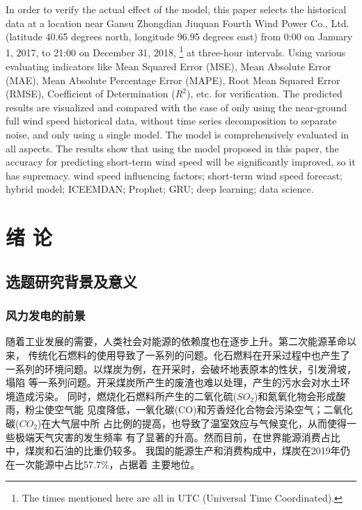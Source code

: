 \documentclass[AutoFakeBold]{LZUThesis}
\begin{document}
{{In order to verify the actual effect of the model, this paper selects the
historical data at a location near Gansu Zhongdian Jiuquan Fourth Wind Power
Co., Ltd. (latitude 40.65 degrees north, longitude 96.95 degrees east) from
0:00 on January 1, 2017, to 21:00 on December 31, 2018, 
\footnote{The times mentioned here are all in UTC (Universal Time Coordinated). }
at three-hour intervals. Using various evaluating indicators like Mean Squared
Error (MSE), Mean Absolute Error (MAE), Mean Absolute Percentage Error (MAPE),
Root Mean Squared Error (RMSE), Coefficient of Determination ($R^2$), etc.
for verification. The predicted results are visualized and compared with the
case of only using the near-ground full wind speed historical data, without
time series decomposition to separate noise, and only using a single model.
The model is comprehensively evaluated in all aspects. The results show
that using the model proposed in this paper, the accuracy for predicting
short-term wind speed will be significantly improved, so it has supremacy.
}}
{wind speed influencing factors; short-term wind speed forecast; 
hybrid model; ICEEMDAN; Prophet; GRU; deep learning; data science.
}

\tableofcontents


\mainmatter

\chapter{绪 \qquad 论}


\section{选题研究背景及意义}
\subsection{风力发电的前景}
随着工业发展的需要，人类社会对能源的依赖度也在逐步上升。第二次能源革命以来，
传统化石燃料的使用导致了一系列的问题。化石燃料在开采过程中也产生了
一系列的环境问题。以煤炭为例，在开采时，会破坏地表原本的性状，引发滑坡，塌陷
等一系列问题。开采煤炭所产生的废渣也难以处理，产生的污水会对水土环境造成污染。
同时，燃烧化石燃料所产生的二氧化硫($SO_2$)和氮氧化物会形成酸雨，粉尘使空气能
见度降低，一氧化碳(CO)和芳香烃化合物会污染空气；二氧化碳($CO_2$)在大气层中所
占比例的提高，也导致了温室效应与气候变化，从而使得一些极端天气灾害的发生频率
有了显著的升高。然而目前，在世界能源消费占比中，煤炭和石油的比重仍较多。
我国的能源生产和消费构成中，煤炭在2019年仍在一次能源中占比57.7\%，占据着
主要地位。\cite{能源数据2021王庆一}
\end{document}
